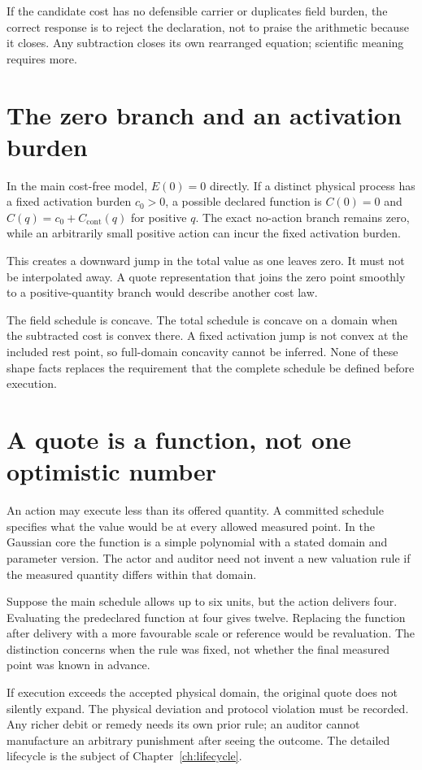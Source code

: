 If the candidate cost has no defensible carrier or duplicates field burden, the correct response is to reject the declaration, not to praise the arithmetic because it closes. Any subtraction closes its own rearranged equation; scientific meaning requires more.

\section{The zero branch and an activation burden}
In the main cost-free model, \(E(0)=0\) directly. If a distinct physical process has a fixed activation burden \(c_0>0\), a possible declared function is \(C(0)=0\) and \(C(q)=c_0+C_{\mathrm{cont}}(q)\) for positive \(q\). The exact no-action branch remains zero, while an arbitrarily small positive action can incur the fixed activation burden.

This creates a downward jump in the total value as one leaves zero. It must not be interpolated away. A quote representation that joins the zero point smoothly to a positive-quantity branch would describe another cost law.

The field schedule is concave. The total schedule is concave on a domain when the subtracted cost is convex there. A fixed activation jump is not convex at the included rest point, so full-domain concavity cannot be inferred. None of these shape facts replaces the requirement that the complete schedule be defined before execution.

\section{A quote is a function, not one optimistic number}
An action may execute less than its offered quantity. A committed schedule specifies what the value would be at every allowed measured point. In the Gaussian core the function is a simple polynomial with a stated domain and parameter version. The actor and auditor need not invent a new valuation rule if the measured quantity differs within that domain.

Suppose the main schedule allows up to six units, but the action delivers four. Evaluating the predeclared function at four gives twelve. Replacing the function after delivery with a more favourable scale or reference would be revaluation. The distinction concerns when the rule was fixed, not whether the final measured point was known in advance.

If execution exceeds the accepted physical domain, the original quote does not silently expand. The physical deviation and protocol violation must be recorded. Any richer debit or remedy needs its own prior rule; an auditor cannot manufacture an arbitrary punishment after seeing the outcome. The detailed lifecycle is the subject of Chapter~\ref{ch:lifecycle}.

